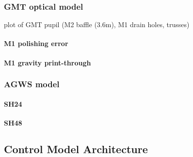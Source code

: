 \documentclass{gmto}
\begin{document}
\subsubsection{GMT optical model}
\label{sec:gom}

plot of GMT pupil (M2 baffle (3.6m), M1 drain holes, trusses)

\paragraph{M1 polishing error}

\paragraph{M1 gravity print-through}

\subsubsection{AGWS model}
\label{sec:agws}

\paragraph{SH24}

\paragraph{SH48}



\clearpage
\subsection{Control Model Architecture}
\label{sec:control}
\end{document}
